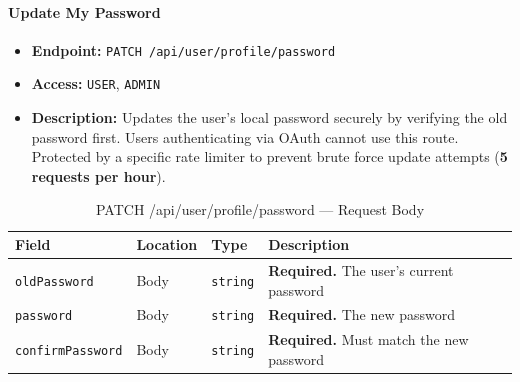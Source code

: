 \paragraph{Update My Password}
\label{subsubsec:update-my-password}

\begin{itemize}
  \item \textbf{Endpoint:} \texttt{PATCH /api/user/profile/password}
  \item \textbf{Access:} \texttt{USER}, \texttt{ADMIN}
  \item \textbf{Description:} Updates the user's local password securely by verifying the old password first. Users authenticating via OAuth cannot use this route. Protected by a specific rate limiter to prevent brute force update attempts (\textbf{5 requests per hour}).
\end{itemize}

\begin{table}[H]
\centering
\renewcommand{\arraystretch}{1.3}
\begin{tabularx}{\textwidth}{|l|l|l|X|}
\hline
\textbf{Field} & \textbf{Location} & \textbf{Type} & \textbf{Description} \\
\hline
\texttt{oldPassword}     & Body & \texttt{string} & \textbf{Required.} The user's current password \\
\hline
\texttt{password}        & Body & \texttt{string} & \textbf{Required.} The new password \\
\hline
\texttt{confirmPassword} & Body & \texttt{string} & \textbf{Required.} Must match the new password \\
\hline
\end{tabularx}
\caption{PATCH /api/user/profile/password — Request Body}
\label{tab:update-my-password-body}
\end{table}

